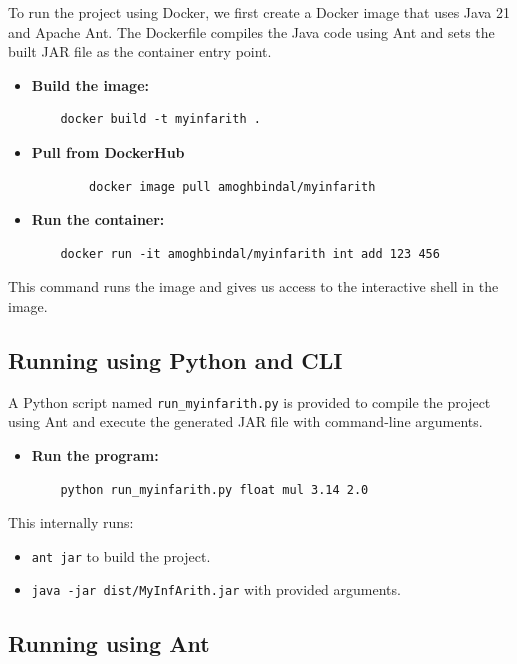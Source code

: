 \documentclass[12pt]{article}
\begin{document}
To run the project using Docker, we first create a Docker image that uses Java 21 and Apache Ant. The Dockerfile compiles the Java code using Ant and sets the built JAR file as the container entry point.

\begin{itemize}
    \item \textbf{Build the image:}
    \begin{verbatim}
    docker build -t myinfarith .
    \end{verbatim}

    \item \textbf{Pull from DockerHub}
    \begin{verbatim}
        docker image pull amoghbindal/myinfarith
    \end{verbatim}

    \item \textbf{Run the container:}
    \begin{verbatim}
    docker run -it amoghbindal/myinfarith int add 123 456
    \end{verbatim}
\end{itemize}

This command runs the image and gives us access to the interactive shell in the image.

\subsection{Running using Python and CLI}

A Python script named \texttt{run\_myinfarith.py} is provided to compile the project using Ant and execute the generated JAR file with command-line arguments.

\begin{itemize}
    \item \textbf{Run the program:}
    \begin{verbatim}
    python run_myinfarith.py float mul 3.14 2.0
    \end{verbatim}
\end{itemize}

This internally runs:
\begin{itemize}
    \item \texttt{ant jar} to build the project.
    \item \texttt{java -jar dist/MyInfArith.jar} with provided arguments.
\end{itemize}

\subsection{Running using Ant}
\end{document}
